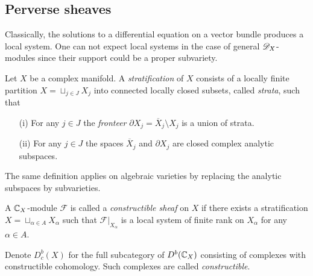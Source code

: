 \subsection{Perverse sheaves}
  Classically, the solutions to a differential equation on a vector bundle produces a local system.
  One can not expect local systems in the case of general $\mathscr{D}_X$-modules since their support could be a proper subvariety.
  \begin{definition}
    Let $X$ be a complex manifold. A {\it stratification} of $X$ consists of a locally finite partition $X  = \sqcup_{j\in J} X_j$ into connected locally closed subsets, called {\it strata}, such that
    \begin{enumerate}
      \item[(i)] For any $j\in J$ the {\it fronteer} $\partial X_j = \overline{X}_j\setminus X_j$ is a union of strata.
      \item[(ii)] For any $j\in J$ the spaces $\overline{X}_j$ and $\partial X_j$ are closed complex analytic subspaces.
    \end{enumerate}
  \end{definition}
  The same definition applies on algebraic varieties by replacing the analytic subspaces by subvarieties.
  \begin{definition}
     A $\mathbb{C}_X$-module $\mathcal{F}$ is called a {\it constructible sheaf} on $X$ if there exists a stratification $X = \sqcup_{\alpha\in A}X_\alpha$ such that $\mathcal{F}\vert_{X_\alpha}$ is a local system of finite rank on $X_\alpha$ for any $\alpha \in A$.
  \end{definition}
  Denote $D^b_c(X)$ for the full subcategory of $D^b(\mathbb{C}_X)$ consisting of complexes with constructible cohomology.
  Such complexes are called {\it constructible}.

